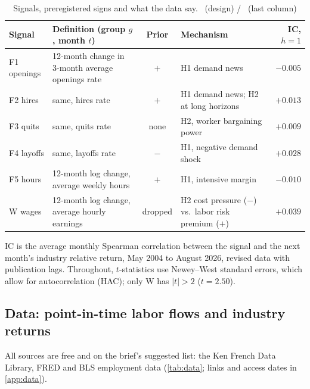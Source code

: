 \begin{table}[H]
\centering\small
\begin{threeparttable}
\caption{Signals, preregistered signs and what the data say. \hfill\tagc\ (design) / \tagp\ (last column)}
\label{tab:hyp}
\begin{tabularx}{\textwidth}{@{}l Y c Y r@{}}
\toprule
Signal & Definition (group $g$, month $t$) & Prior & Mechanism & IC, $h{=}1$ \\
\midrule
F1 openings & 12-month change in 3-month average openings rate & $+$ & H1 demand news & $-0.005$ \\ %
F2 hires    & same, hires rate & $+$ & H1 demand news; H2 at long horizons & $+0.013$ \\ %
F3 quits    & same, quits rate & none & H2, worker bargaining power & $+0.009$ \\ %
F4 layoffs  & same, layoffs rate & $-$ & H1, negative demand shock & $+0.028$ \\ %
F5 hours    & 12-month log change, average weekly hours & $+$ & H1, intensive margin & $-0.010$ \\ %
W wages     & 12-month log change, average hourly earnings & dropped & H2 cost pressure ($-$) vs.\ labor risk premium ($+$) & $+0.039$ \\ %
\bottomrule
\end{tabularx}
\begin{tablenotes}\footnotesize
\item IC is the average monthly Spearman correlation between the signal and the next month's industry relative return, May 2004 to August 2026, revised data with publication lags. Throughout, $t$-statistics use Newey--West standard errors, which allow for autocorrelation (HAC); only W has $|t|>2$ ($t=2.50$). %
\end{tablenotes}
\end{threeparttable}
\end{table}

\subsection{Data: point-in-time labor flows and industry returns}\label{sec:data}

All sources are free and on the brief's suggested list: the Ken French Data Library, FRED and BLS employment data (\cref{tab:data}; links and access dates in \cref{app:data}).

